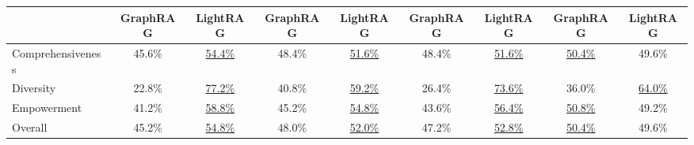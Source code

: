 \begin{table}[t]
{\begin{tabular}{@{}lcccccccc@{}}
\cmidrule(lr){2-3} \cmidrule(lr){4-5} \cmidrule(lr){6-7} \cmidrule(lr){8-9}
                      & GraphRAG & \textbf{LightRAG} & GraphRAG & \textbf{LightRAG} & GraphRAG & \textbf{LightRAG} & GraphRAG & \textbf{LightRAG} \\
\midrule
Comprehensiveness      & 45.6\%      & \underline{54.4\%}     & 48.4\%      & \underline{51.6\%}     &  48.4\%     & \underline{51.6\%}     & \underline{50.4\%}      & 49.6\%     \\
Diversity              & 22.8\%      & \underline{77.2\%}     & 40.8\%      & \underline{59.2\%}     &  26.4\%     & \underline{73.6\%}     & 36.0\%      & \underline{64.0\%}     \\
Empowerment            & 41.2\%      & \underline{58.8\%}     & 45.2\%      & \underline{54.8\%}     & 43.6\%      & \underline{56.4\%}     & \underline{50.8\%}      & 49.2\%     \\
Overall                & 45.2\%      & \underline{54.8\%}     & 48.0\%      & \underline{52.0\%}     & 47.2\%      & \underline{52.8\%}     & \underline{50.4\%}      & 49.6\%     \\
\bottomrule
\end{tabular}
}
\end{table}

